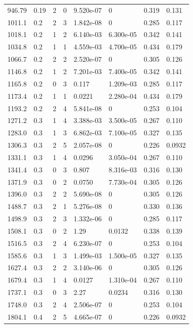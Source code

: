 \documentclass[preview]{standalone}
\begin{document}
{{{\begin{tabular}{L{1.2cm}C{1.2cm} C{0.3cm}C{0.5cm} C{1.4cm}C{1.4cm} C{1.4cm}C{1.4cm}}
  946.79  &  0.19  & 2     &  0 &  9.520e-07  & 0  & 0.319 &  0.131   \\ 
  1011.1  &   0.2  & 2     &  3 &  1.842e-08  & 0  & 0.285 &  0.117   \\ 
  1018.1  &   0.2  & 1     &  2 &  6.140e-03  & 6.300e-05  & 0.342 &  0.141   \\ 
  1034.8  &   0.2  & 1     &  1 &  4.559e-03  & 4.700e-05  & 0.434 &  0.179   \\ 
  1066.7  &   0.2  & 2     &  2 &  2.520e-07  & 0  & 0.305 &  0.126   \\ 
  1146.8  &   0.2  & 1     &  2 &  7.201e-03  & 7.400e-05  & 0.342 &  0.141   \\ 
  1165.8  &   0.2  & 0     &  3 &  0.117  & 1.209e-03  & 0.285 &  0.117   \\ 
  1173.4  &   0.2  & 1     &  1 &  0.0221  & 2.280e-04  & 0.434 &  0.179   \\ 
  1193.2  &   0.2  & 2     &  4 &  5.841e-08  & 0  & 0.253 &  0.104   \\ 
  1271.2  &   0.3  & 1     &  4 &  3.388e-03  & 3.500e-05  & 0.267 &  0.110   \\ 
  1283.0  &   0.3  & 1     &  3 &  6.862e-03  & 7.100e-05  & 0.327 &  0.135   \\ 
  1306.3  &   0.3  & 2     &  5 &  2.057e-08  & 0  & 0.226 &  0.0932   \\ 
  1331.1  &   0.3  & 1     &  4 &  0.0296  & 3.050e-04  & 0.267 &  0.110   \\ 
  1341.4  &   0.3  & 0     &  3 &  0.807  & 8.316e-03  & 0.316 &  0.130   \\ 
  1371.9  &   0.3  & 0     &  2 &  0.0750  & 7.730e-04  & 0.305 &  0.126   \\ 
  1396.0  &   0.3  & 2     &  2 &  5.690e-08  & 0  & 0.305 &  0.126   \\ 
  1488.7  &   0.3  & 2     &  1 &  5.276e-08  & 0  & 0.330 &  0.136   \\ 
  1498.9  &   0.3  & 2     &  3 &  1.332e-06  & 0  & 0.285 &  0.117   \\ 
  1508.1  &   0.3  & 0     &  2 &  1.29  & 0.0132  & 0.338 &  0.139   \\ 
  1516.5  &   0.3  & 2     &  4 &  6.230e-07  & 0  & 0.253 &  0.104   \\ 
  1585.6  &   0.3  & 1     &  3 &  1.499e-03  & 1.500e-05  & 0.327 &  0.135   \\ 
  1627.4  &   0.3  & 2     &  2 &  3.140e-06  & 0  & 0.305 &  0.126   \\ 
  1679.4  &   0.3  & 1     &  4 &  0.0127  & 1.310e-04  & 0.267 &  0.110   \\ 
  1737.1  &   0.3  & 0     &  3 &  2.27  & 0.0234  & 0.316 &  0.130   \\ 
  1748.0  &   0.3  & 2     &  4 &  2.506e-07  & 0  & 0.253 &  0.104   \\ 
  1804.1  &   0.4  & 2     &  5 &  4.665e-07  & 0  & 0.226 &  0.0932   \\ 
\hline 
\end{tabular} 

}}}
\end{document}
